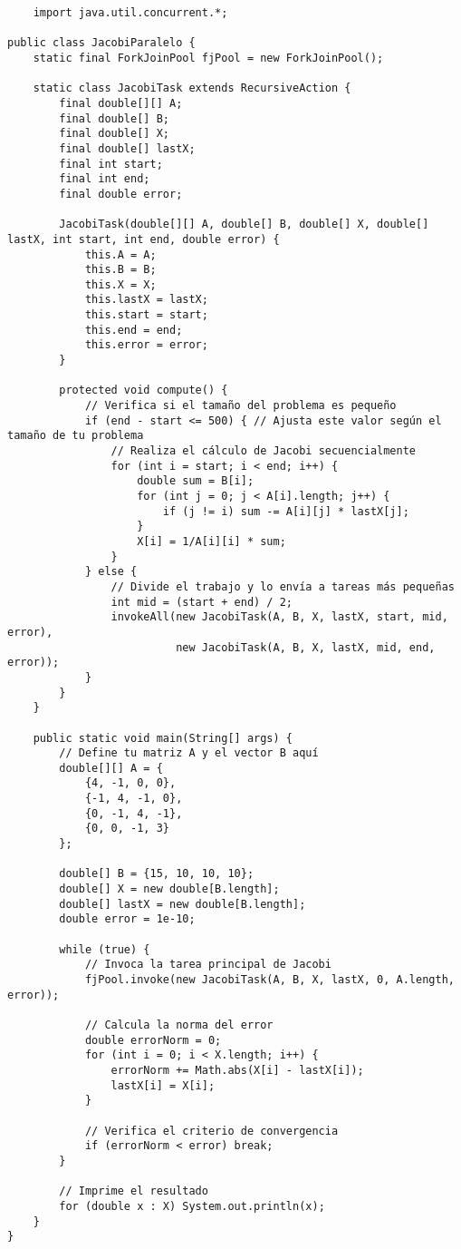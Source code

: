 \documentclass[]{article}
\begin{document}
\begin{verbatim}
    import java.util.concurrent.*;

public class JacobiParalelo {
    static final ForkJoinPool fjPool = new ForkJoinPool();

    static class JacobiTask extends RecursiveAction {
        final double[][] A;
        final double[] B;
        final double[] X;
        final double[] lastX;
        final int start;
        final int end;
        final double error;

        JacobiTask(double[][] A, double[] B, double[] X, double[] lastX, int start, int end, double error) {
            this.A = A;
            this.B = B;
            this.X = X;
            this.lastX = lastX;
            this.start = start;
            this.end = end;
            this.error = error;
        }

        protected void compute() {
            // Verifica si el tamaño del problema es pequeño
            if (end - start <= 500) { // Ajusta este valor según el tamaño de tu problema
                // Realiza el cálculo de Jacobi secuencialmente
                for (int i = start; i < end; i++) {
                    double sum = B[i];
                    for (int j = 0; j < A[i].length; j++) {
                        if (j != i) sum -= A[i][j] * lastX[j];
                    }
                    X[i] = 1/A[i][i] * sum;
                }
            } else {
                // Divide el trabajo y lo envía a tareas más pequeñas
                int mid = (start + end) / 2;
                invokeAll(new JacobiTask(A, B, X, lastX, start, mid, error),
                          new JacobiTask(A, B, X, lastX, mid, end, error));
            }
        }
    }

    public static void main(String[] args) {
        // Define tu matriz A y el vector B aquí
        double[][] A = {
            {4, -1, 0, 0},
            {-1, 4, -1, 0},
            {0, -1, 4, -1},
            {0, 0, -1, 3}
        };
        
        double[] B = {15, 10, 10, 10};
        double[] X = new double[B.length];
        double[] lastX = new double[B.length];
        double error = 1e-10;

        while (true) {
            // Invoca la tarea principal de Jacobi
            fjPool.invoke(new JacobiTask(A, B, X, lastX, 0, A.length, error));

            // Calcula la norma del error
            double errorNorm = 0;
            for (int i = 0; i < X.length; i++) {
                errorNorm += Math.abs(X[i] - lastX[i]);
                lastX[i] = X[i];
            }

            // Verifica el criterio de convergencia
            if (errorNorm < error) break;
        }

        // Imprime el resultado
        for (double x : X) System.out.println(x);
    }
}

    \end{verbatim}
    
\end{document}
